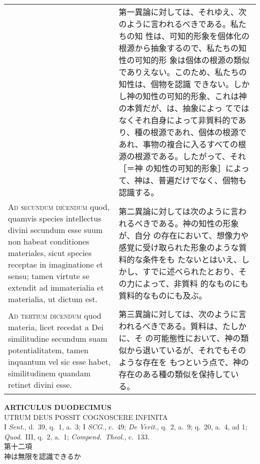 \documentclass[10pt]{jsarticle} %
\begin{document}
\begin{longtable}{p{21em}p{21em}}
&

第一異論に対しては、それゆえ、次のように言われるべきである。私たちの知
性は、可知的形象を個体化の根源から抽象するので、私たちの知性の可知的形
象は個体の根源の類似でありえない。このため、私たちの知性は、個物を認識
できない。しかし神の知性の可知的形象、これは神の本質だが、は、抽象によっ
てではなくそれ自身によって非質料的であり、種の根源であれ、個体の根源で
あれ、事物の複合に入るすべての根源の根源である。したがって、それ［＝神
の知性の可知的形象］によって、神は、普遍だけでなく、個物も認識する。


\\


{\scshape Ad secundum dicendum} quod, quamvis species intellectus
divini secundum esse suum non habeat conditiones materiales, sicut
species receptae in imaginatione et sensu; tamen virtute se extendit
ad immaterialia et materialia, ut dictum est.


&

第二異論に対しては次のように言われるべきである。神の知性の形象が、自分
の存在において、想像力や感覚に受け取られた形象のような質料的な条件をも
たないとはいえ、しかし、すでに述べられたとおり、その力によって、非質料
的なものにも質料的なものにも及ぶ。


\\


{\scshape Ad tertium dicendum} quod materia, licet recedat a Dei
similitudine secundum suam potentialitatem, tamen inquantum vel sic
esse habet, similitudinem quandam retinet divini esse.


&

第三異論に対しては、次のように言われるべきである。質料は、たしかに、そ
の可能態性において、神の類似から退いているが、それでもそのような存在を
もつという点で、神の存在のある種の類似を保持している。




\end{longtable}
\newpage


\begin{center}
{\Large {\bf ARTICULUS DUODECIMUS}}\\ {\large UTRUM DEUS POSSIT
COGNOSCERE INFINITA}\\ {\footnotesize I {\itshape Sent.}, d.~39, q.~1,
a.~3; I {\itshape SCG.}, c.~49; {\itshape De Verit.}, q.~2, a.~9;
q.~20, a.~4, ad 1; {\itshape Quod}.~III, q.~2, a.~1; {\itshape
Compend.~Theol.}, c.~133.}\\ {\Large 第十二項\\神は無限を認識できるか}
\end{center}
\end{document}
